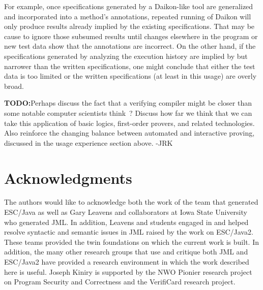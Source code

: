 \documentclass{acm_proc_article-sp}
\begin{document}
For example, once specifications generated by a Daikon-like tool are
generalized and incorporated into a method's annotations, repeated
running of Daikon will only produce results already implied by the
existing specifications.  That may be cause to ignore those subsumed
results until changes elsewhere in the program or new test data show
that the annotations are incorrect.  On the other hand, if the
specifications generated by analyzing the execution history are
implied by but narrower than the written specifications, one might
conclude that either the test data is too limited or the written
specifications (at least in this usage) are overly broad.



\large\textbf{TODO:}\normalsize Perhaps discuss the fact that a
verifying compiler might be closer than some notable computer
scientists think~\cite{Hoare03}?  Discuss how far we think that we can
take this application of basic logics, first-order provers, and
related technologies.  Also reinforce the changing balance between
automated and interactive proving, discussed in the usage experience
section above. -JRK

\section{Acknowledgments}
The authors would like to acknowledge both the work of the team that
generated ESC/Java as well as Gary Leavens and collaborators at Iowa
State University who generated JML.  In addition, Leavens and students
engaged in and helped resolve syntactic and semantic issues in JML
raised by the work on ESC/Java2.  These teams provided the twin
foundations on which the current work is built.  In addition, the many
other research groups that use and critique both JML and ESC/Java2
have provided a research environment in which the work described here
is useful.  Joseph Kiniry is supported by the NWO Pionier research
project on Program Security and Correctness and the VerifiCard
research project.

%

  
%
%
\balancecolumns

\end{document}
